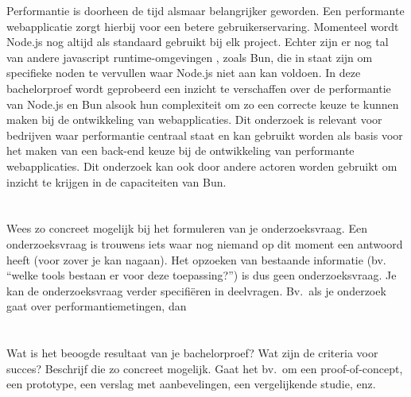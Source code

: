 Performantie is doorheen de tijd alsmaar belangrijker geworden. 
Een performante webapplicatie zorgt hierbij voor een betere gebruikerservaring. 
Momenteel wordt Node.js nog altijd als standaard gebruikt bij elk project. Echter zijn er nog tal van andere javascript runtime-omgevingen
, zoals Bun, die in staat zijn om specifieke noden te vervullen waar Node.js niet aan kan voldoen. In deze bachelorproef wordt geprobeerd 
een inzicht te verschaffen over de performantie van Node.js en Bun alsook hun complexiteit 
om zo een correcte keuze te kunnen maken bij de ontwikkeling van webapplicaties.
Dit onderzoek is relevant voor bedrijven waar performantie centraal staat en kan gebruikt worden als basis 
voor het maken van een back-end keuze bij de ontwikkeling van performante webapplicaties. Dit onderzoek kan 
ook door andere actoren worden gebruikt om inzicht te krijgen in de capaciteiten van Bun.

\section{}%
\label{sec:onderzoeksvraag}

Wees zo concreet mogelijk bij het formuleren van je onderzoeksvraag. Een onderzoeksvraag is trouwens iets waar nog niemand op dit moment een antwoord heeft (voor zover je kan nagaan). Het opzoeken van bestaande informatie (bv. ``welke tools bestaan er voor deze toepassing?'') is dus geen onderzoeksvraag. Je kan de onderzoeksvraag verder specifiëren in deelvragen. Bv.~als je onderzoek gaat over performantiemetingen, dan 

\section{}%
\label{sec:onderzoeksdoelstelling}

Wat is het beoogde resultaat van je bachelorproef? Wat zijn de criteria voor succes? Beschrijf die zo concreet mogelijk. Gaat het bv.\ om een proof-of-concept, een prototype, een verslag met aanbevelingen, een vergelijkende studie, enz.

\section{}%
\label{sec:opzet-bachelorproef}

